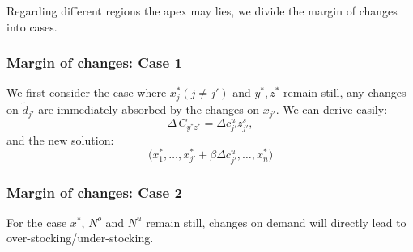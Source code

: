\documentclass[a4paper,11pt]{article}
\begin{document}
Regarding different regions the apex may lies, we divide the margin of changes into cases.

\subsubsection*{Margin of changes: Case 1}
We first consider the case where $x_j^*(j \neq j')$ and $y^*,z^*$ remain still, any changes on $\tilde{d}_{j'}$ are immediately absorbed by the changes on $x_{j'}$. We can derive easily:
\[
    \Delta \, C_{y^*z^*} = \Delta c_{j'}^u z_{j'}^s,
\]
and the new solution:
\[
\big( x_1^*,\dots,x_{j'}^*+\beta \Delta c_{j'}^u,\dots,x_n^*  \big)
\]

\subsubsection*{Margin of changes: Case 2}
For the case $x^*$, $N^o$ and $N^u$ remain still, changes on demand will directly lead to over-stocking/under-stocking.
\end{document}
